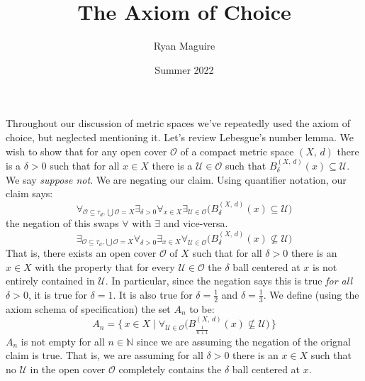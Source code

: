 \documentclass{article}
\title{The Axiom of Choice}
\author{Ryan Maguire}
\date{Summer 2022}
\theoremstyle{normal}
\begin{document}
    \maketitle
    Throughout our discussion of metric spaces we've repeatedly used the axiom
    of choice, but neglected mentioning it. Let's review Lebesgue's number
    lemma. We wish to show that for any open cover $\mathcal{O}$ of a compact
    metric space $(X,\,d)$ there is a $\delta>0$ such that for all $x\in{X}$
    there is a $\mathcal{U}\in\mathcal{O}$ such that
    $B_{\delta}^{(X,\,d)}(x)\subseteq\mathcal{U}$. We say \textit{suppose not}.
    We are negating our claim. Using quantifier notation, our claim says:
    \begin{equation}
        \forall_{\mathcal{O}\subseteq\tau_{d},\bigcup\mathcal{O}=X}
            \exists_{\delta>0}\forall_{x\in{X}}
            \exists_{\mathcal{U}\in\mathcal{O}}
            \Big(B_{\delta}^{(X,\,d)}(x)\subseteq\mathcal{U}\Big)
    \end{equation}
    the negation of this swaps $\forall$ with $\exists$ and vice-versa.
    \begin{equation}
        \exists_{\mathcal{O}\subseteq\tau_{d},\bigcup\mathcal{O}=X}
            \forall_{\delta>0}\exists_{x\in{X}}
            \forall_{\mathcal{U}\in\mathcal{O}}
            \Big(B_{\delta}^{(X,\,d)}(x)\nsubseteq\mathcal{U}\Big)
    \end{equation}
    That is, there exists an open cover $\mathcal{O}$ of $X$ such that
    for all $\delta>0$ there is an $x\in{X}$ with the property that for every
    $\mathcal{U}\in\mathcal{O}$ the $\delta$ ball centered at $x$ is not
    entirely contained in $\mathcal{U}$. In particular, since the negation
    says this is true \textit{for all} $\delta>0$, it is true for
    $\delta=1$. It is also true for $\delta=\frac{1}{2}$ and
    $\delta=\frac{1}{3}$. We define (using the axiom schema of specification)
    the set $A_{n}$ to be:
    \begin{equation}
        A_{n}=\Big\{\,x\in{X}\;|\;\forall_{\mathcal{U}\in\mathcal{O}}
            \Big(
                B_{\frac{1}{n+1}}^{(X,\,d)}(x)\nsubseteq\mathcal{U}
            \Big)\,
        \Big\}
    \end{equation}
    $A_{n}$ is not empty for all $n\in\mathbb{N}$ since we are assuming the
    negation of the orignal claim is true. That is, we are assuming for all
    $\delta>0$ there is an $x\in{X}$ such that no $\mathcal{U}$ in the open
    cover $\mathcal{O}$ completely contains the $\delta$ ball centered at $x$.
\end{document}
